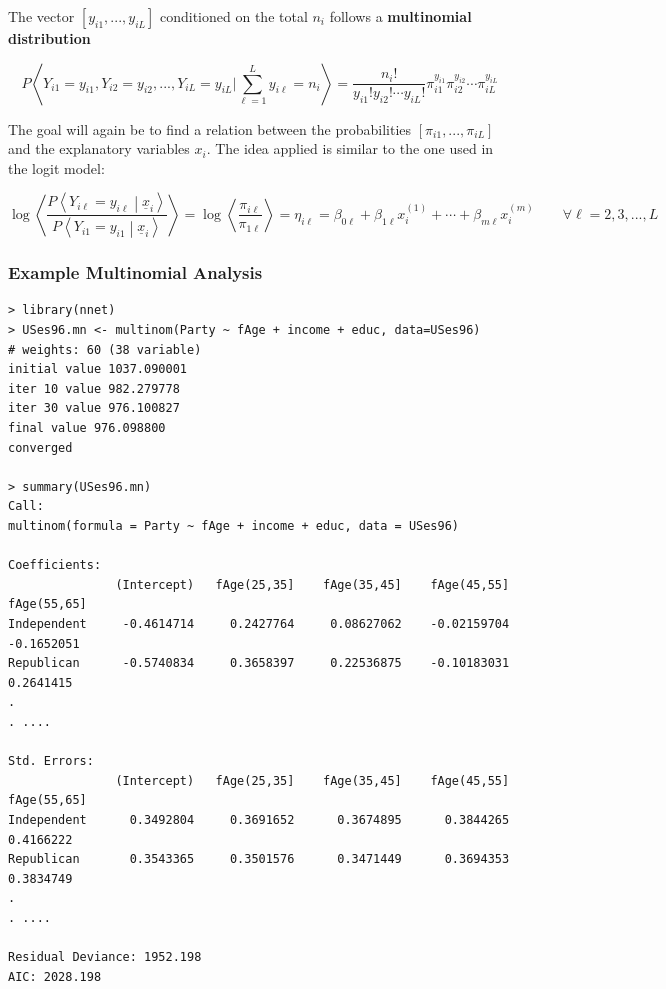 \documentclass[11pt]{article}
\begin{document}
The vector $[y_{i1},..., y_{iL}]$ conditioned on the total $n_i$ follows a \textbf{multinomial distribution}

\begin{equation*}
	P\left\langle Y_{i1}=y_{i1}, Y_{i2}=y_{i2}, ... , Y_{iL}=y_{iL} | \sum_{\ell=1}^{L} y_{i\ell} = n_i \right\rangle = \frac{n_i !}{y_{i1}!y_{i2}!\cdots y_{iL}!} \pi_{i1}^{y_{i1}}\pi_{i2}^{y_{i2}}\cdots\pi_{iL}^{y_{iL}}
\end{equation*}

The goal will again be to find a relation between the probabilities $[ \pi_{i1},...,\pi_{iL} ]$ and the explanatory variables $x_i$. The idea applied is similar to the one used in the logit model:

\begin{equation*}
	\log\left\langle \frac{P\left\langle Y_{i\ell}=y_{i\ell}\middle| \underline{x}_i\right\rangle}{P\left\langle Y_{i1}=y_{i1}\middle| \underline{x}_i\right\rangle} \right\rangle = \log\left\langle\frac{\pi_{i\ell}}{\pi_{1\ell}}\right\rangle = \eta_{i\ell} = \beta_{0\ell} + \beta_{1\ell}x_i^{(1)} + \cdots + \beta_{m\ell}x_i^{(m)}\qquad\forall\ell=2,3,...,L
\end{equation*}

\subsubsection{Example Multinomial Analysis}

\begin{verbatim}
> library(nnet)
> USes96.mn <- multinom(Party ~ fAge + income + educ, data=USes96)
# weights: 60 (38 variable)
initial value 1037.090001
iter 10 value 982.279778
iter 30 value 976.100827
final value 976.098800
converged

> summary(USes96.mn)
Call:
multinom(formula = Party ~ fAge + income + educ, data = USes96)

Coefficients:
               (Intercept)   fAge(25,35]    fAge(35,45]    fAge(45,55]    fAge(55,65]
Independent     -0.4614714     0.2427764     0.08627062    -0.02159704     -0.1652051
Republican      -0.5740834     0.3658397     0.22536875    -0.10183031      0.2641415
.
. ....

Std. Errors:
               (Intercept)   fAge(25,35]    fAge(35,45]    fAge(45,55]    fAge(55,65]
Independent      0.3492804     0.3691652      0.3674895      0.3844265      0.4166222
Republican       0.3543365     0.3501576      0.3471449      0.3694353      0.3834749
.
. ....

Residual Deviance: 1952.198
AIC: 2028.198
\end{verbatim}
\end{document}
